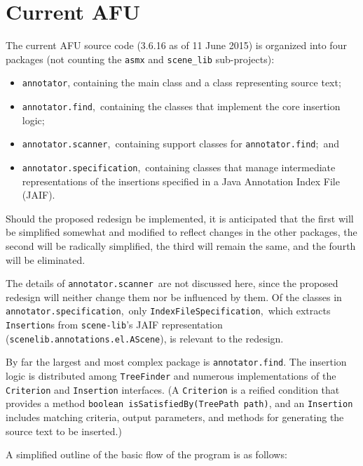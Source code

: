 \documentclass{article}
\begin{document}
\section{Current AFU}

The current AFU source code (3.6.16 as of 11 June 2015) is organized
into four packages (not counting the \texttt{asmx} and
\texttt{scene\_lib} sub-projects):
\begin{itemize}
\item  \texttt{annotator}, containing the main class and a class
representing source text;
\item  \texttt{annotator.find},\ containing the classes that implement
the core insertion logic;
\item  \texttt{annotator.scanner},\ containing support classes for
\texttt{annotator.find};\ and
\item  \texttt{annotator.specification},\ containing classes that
manage intermediate representations of the insertions specified in a
Java Annotation Index File (JAIF).
\end{itemize}
Should the proposed redesign be implemented, it is anticipated that the
first will be simplified somewhat and modified to reflect changes in the
other packages, the second will be radically simplified, the third will
remain the same, and the fourth will be eliminated.

The details of \texttt{annotator.scanner}\ are not discussed here, since
the proposed redesign will neither change them nor be influenced by
them.  Of the classes in \texttt{annotator.specification},\ only
\texttt{IndexFileSpecification},\ which extracts \texttt{Insertion}s
from \texttt{scene-lib}'s JAIF representation
(\texttt{scenelib.annotations.el.AScene}), is relevant to the redesign.

By far the largest and most complex package is \texttt{annotator.find}.
The insertion logic is distributed among \texttt{TreeFinder} and
numerous implementations of the \texttt{Criterion} and
\texttt{Insertion} interfaces.  (A \texttt{Criterion} is a reified
condition that provides a method
\texttt{boolean isSatisfiedBy(TreePath path)},
and an \texttt{Insertion} includes matching criteria, output parameters,
and methods for generating the source text to be inserted.)

A simplified outline of the basic flow of the program is as follows:
\end{document}
